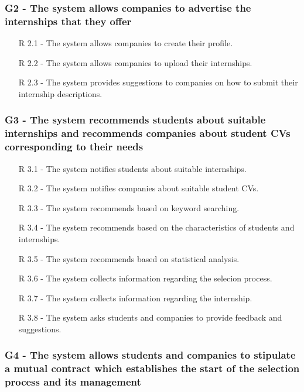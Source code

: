 \subsubsection{G2 - The system allows companies to advertise the internships that they offer}
\hspace*{15mm}
\begin{itemize}
    \item [R 2.1] - The system allows companies to create their profile.
    \item [R 2.2] - The system allows companies to upload their internships.
    \item [R 2.3] - The system provides suggestions to companies on how to submit their internship descriptions.
\end{itemize}
\hspace*{15mm}

\subsubsection{G3 - The system recommends students about suitable internships and recommends
companies about student CVs corresponding to their needs}
\hspace*{15mm}
\begin{itemize}
    \item [R 3.1] - The system notifies students about suitable internships.
    \item [R 3.2] - The system notifies companies about suitable student CVs.
    \item [R 3.3] - The system recommends based on keyword searching.
    \item [R 3.4] - The system recommends based on the characteristics of students and internships.
    \item [R 3.5] - The system recommends based on statistical analysis.
    \item [R 3.6] - The system collects information regarding the selecion process.
    \item [R 3.7] - The system collects information regarding the internship.
    \item [R 3.8] - The system asks students and companies to provide feedback and suggestions.
\end{itemize}
\hspace*{15mm}

\subsubsection{G4 - The system allows students
 and companies to stipulate a mutual contract
which establishes the start of the selection process and its management}
\hspace*{15mm}



